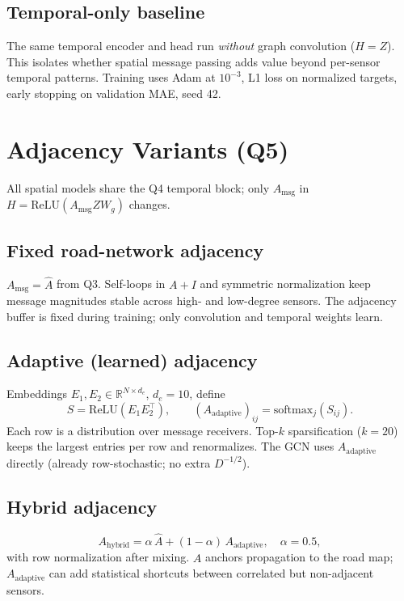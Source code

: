 \subsection{Temporal-only baseline}

The same temporal encoder and head run \emph{without} graph convolution ($H=Z$).
This isolates whether spatial message passing adds value beyond per-sensor temporal patterns.
Training uses Adam at $10^{-3}$, L1 loss on normalized targets, early stopping on validation MAE, seed 42.

\section{Adjacency Variants (Q5)}

All spatial models share the Q4 temporal block; only $A_{\mathrm{msg}}$ in $H=\mathrm{ReLU}(A_{\mathrm{msg}} Z W_g)$ changes.

\subsection{Fixed road-network adjacency}

$A_{\mathrm{msg}} = \hat{A}$ from Q3.
Self-loops in $A+I$ and symmetric normalization keep message magnitudes stable across high- and low-degree sensors.
The adjacency buffer is fixed during training; only convolution and temporal weights learn.

\subsection{Adaptive (learned) adjacency}

Embeddings $E_1, E_2 \in \mathbb{R}^{N \times d_e}$, $d_e=10$, define
\[
  S = \mathrm{ReLU}(E_1 E_2^\top), \qquad
  (A_{\mathrm{adaptive}})_{ij} = \mathrm{softmax}_j(S_{ij}).
\]
Each row is a distribution over message receivers.
Top-$k$ sparsification ($k=20$) keeps the largest entries per row and renormalizes.
The GCN uses $A_{\mathrm{adaptive}}$ directly (already row-stochastic; no extra $D^{-1/2}$).

\subsection{Hybrid adjacency}

\[
  A_{\mathrm{hybrid}} = \alpha\,\hat{A} + (1-\alpha)\,A_{\mathrm{adaptive}}, \quad \alpha=0.5,
\]
with row normalization after mixing.
$\hat{A}$ anchors propagation to the road map; $A_{\mathrm{adaptive}}$ can add statistical shortcuts between correlated but non-adjacent sensors.

